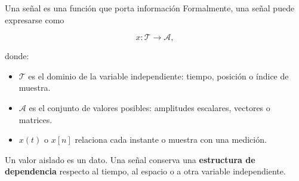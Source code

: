 \documentclass[
  ignorenonframetext,
  aspectratio=169,
  spanish,
  professionalfonts]{beamer}
\providecommand{\tightlist}{%
  \setlength{\itemsep}{0pt}\setlength{\parskip}{0pt}}
\begin{document}
\begin{frame}{Una señal es una función que porta información}
\protect{}\label{una-seuxf1al-es-una-funciuxf3n-que-porta-informaciuxf3n}
Formalmente, una señal puede expresarse como

\[
x:\mathcal{T}\longrightarrow\mathcal{A},
\]

donde:

\begin{itemize}
\tightlist
\item
  \(\mathcal{T}\) es el dominio de la variable independiente: tiempo,
  posición o índice de muestra.
\item
  \(\mathcal{A}\) es el conjunto de valores posibles: amplitudes
  escalares, vectores o matrices.
\item
  \(x(t)\) o \(x[n]\) relaciona cada instante o muestra con una
  medición.
\end{itemize}

\begin{tcolorbox}[enhanced jigsaw, arc=.35mm, bottomrule=.15mm, bottomtitle=1mm, breakable, colback=white, colbacktitle=quarto-callout-note-color!10!white, colframe=quarto-callout-note-color-frame, coltitle=black, left=2mm, leftrule=.75mm, opacityback=0, opacitybacktitle=0.6, rightrule=.15mm, title={No confunda dato con señal}, titlerule=0mm, toprule=.15mm, toptitle=1mm]

Un valor aislado es un dato. Una señal conserva una \textbf{estructura
de dependencia} respecto al tiempo, al espacio o a otra variable
independiente.

\end{tcolorbox}
\end{frame}
\end{document}
